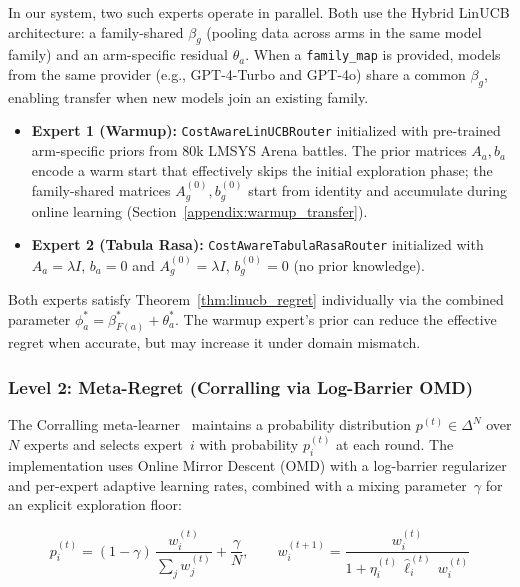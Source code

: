 In our system, two such experts operate in parallel.  Both use the Hybrid
LinUCB architecture: a family-shared $\beta_g$ (pooling data across arms in
the same model family) and an arm-specific residual $\theta_a$.  When a
\texttt{family\_map} is provided, models from the same provider (e.g.,
GPT-4-Turbo and GPT-4o) share a common $\beta_g$, enabling transfer when new
models join an existing family.
\begin{itemize}[leftmargin=*,noitemsep]
    \item \textbf{Expert 1 (Warmup):} \texttt{CostAwareLinUCBRouter} initialized
    with pre-trained arm-specific priors from 80k LMSYS Arena battles.
    The prior matrices $A_a, b_a$ encode a warm start that effectively skips
    the initial exploration phase; the family-shared matrices $A_g^{(0)},
    b_g^{(0)}$ start from identity and accumulate during online learning
    (Section~\ref{appendix:warmup_transfer}).
    \item \textbf{Expert 2 (Tabula Rasa):} \texttt{CostAwareTabulaRasaRouter}
    initialized with $A_a = \lambda I$, $b_a = 0$ and
    $A_g^{(0)} = \lambda I$, $b_g^{(0)} = 0$ (no prior knowledge).
\end{itemize}

Both experts satisfy Theorem~\ref{thm:linucb_regret} individually via the
combined parameter $\phi_a^* = \beta_{F(a)}^* + \theta_a^*$.  The warmup
expert's prior can reduce the effective regret when accurate, but may increase
it under domain mismatch.

\subsubsection{Level 2: Meta-Regret (Corralling via Log-Barrier OMD)}

The Corralling meta-learner~\cite{agarwal2017corralling} maintains a
probability distribution $p^{(t)} \in \Delta^N$ over $N$ experts and selects
expert~$i$ with probability $p_i^{(t)}$ at each round.  The implementation
uses Online Mirror Descent (OMD) with a log-barrier regularizer and
per-expert adaptive learning rates, combined with a mixing
parameter~$\gamma$ for an explicit exploration floor:

\begin{equation}
p_i^{(t)} = (1 - \gamma)\,\frac{w_i^{(t)}}{\sum_j w_j^{(t)}} + \frac{\gamma}{N},
\qquad
w_i^{(t+1)} = \frac{w_i^{(t)}}{1 + \eta_i^{(t)}\,\hat{\ell}_i^{(t)}\,w_i^{(t)}}
\label{eq:corralling_update}
\end{equation}

